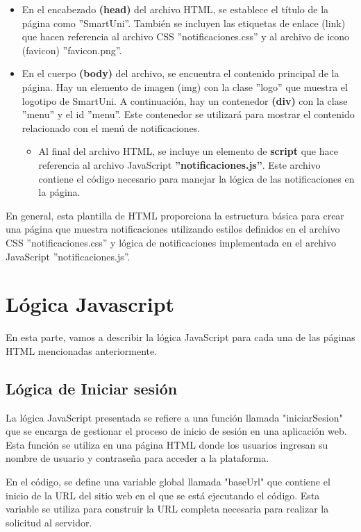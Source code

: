\documentclass[12pt]{report}
\begin{document}
\begin{itemize}
    \item En el encabezado \textbf{(head) }del archivo HTML, se establece el título de la página como ''SmartUni''. También se incluyen las etiquetas de enlace (link) que hacen referencia al archivo CSS ''notificaciones.css'' y al archivo de icono (favicon) ''favicon.png''.

    \item En el cuerpo \textbf{(body)} del archivo, se encuentra el contenido principal de la página. Hay un elemento de imagen (img) con la clase ''logo'' que muestra el logotipo de SmartUni. A continuación, hay un contenedor\textbf{ (div)} con la clase ''menu'' y el id ''menu''. Este contenedor se utilizará para mostrar el contenido relacionado con el menú de notificaciones.

    \begin{itemize}
        \item Al final del archivo HTML, se incluye un elemento de \textbf{script} que hace referencia al archivo JavaScript \textbf{''notificaciones.js''}. Este archivo contiene el código necesario para manejar la lógica de las notificaciones en la página.
    \end{itemize}
\end{itemize}

En general, esta plantilla de HTML proporciona la estructura básica para crear una página que muestra notificaciones utilizando estilos definidos en el archivo CSS ''notificaciones.css'' y lógica de notificaciones implementada en el archivo JavaScript ''notificaciones.js''.


\section{Lógica Javascript}
En esta parte, vamos a describir la lógica JavaScript para cada una de las páginas HTML mencionadas anteriormente.

\subsection{Lógica de Iniciar sesión}
La lógica JavaScript presentada se refiere a una función llamada "iniciarSesion" que se encarga de gestionar el proceso de inicio de sesión en una aplicación web. Esta función se utiliza en una página HTML donde los usuarios ingresan su nombre de usuario y contraseña para acceder a la plataforma.

En el código, se define una variable global llamada "baseUrl" que contiene el inicio de la URL del sitio web en el que se está ejecutando el código. Esta variable se utiliza para construir la URL completa necesaria para realizar la solicitud al servidor.
\end{document}
